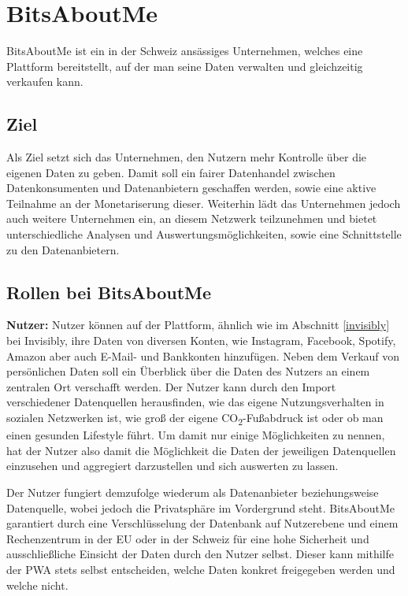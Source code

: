 \section{BitsAboutMe}
BitsAboutMe ist ein in der Schweiz ansässiges Unternehmen, welches eine Plattform bereitstellt, auf der man seine Daten verwalten und gleichzeitig verkaufen kann.

\subsection{Ziel}
Als Ziel setzt sich das Unternehmen, den Nutzern mehr Kontrolle über die eigenen Daten zu geben. Damit soll ein fairer Datenhandel zwischen Datenkonsumenten und Datenanbietern geschaffen werden, sowie eine aktive Teilnahme an der Monetariserung dieser. Weiterhin lädt das Unternehmen jedoch auch weitere Unternehmen ein, an diesem Netzwerk teilzunehmen und bietet unterschiedliche Analysen und Auswertungsmöglichkeiten, sowie eine Schnittstelle zu den Datenanbietern.

\subsection{Rollen bei BitsAboutMe}
\textbf{Nutzer:} Nutzer können auf der Plattform, ähnlich wie im Abschnitt \ref{invisibly} bei Invisibly, ihre Daten von diversen Konten, wie Instagram, Facebook, Spotify, Amazon aber auch E-Mail- und Bankkonten hinzufügen. Neben dem Verkauf von persönlichen Daten soll ein Überblick über die Daten des Nutzers an einem zentralen Ort verschafft werden. Der Nutzer kann durch den Import verschiedener Datenquellen herausfinden, wie das eigene Nutzungsverhalten in sozialen Netzwerken ist, wie groß der eigene CO\textsubscript{2}-Fußabdruck ist oder ob man einen gesunden Lifestyle führt. Um damit nur einige Möglichkeiten zu nennen, hat der Nutzer also damit die Möglichkeit die Daten der jeweiligen Datenquellen einzusehen und aggregiert darzustellen und sich auswerten zu lassen. \newline

\noindent Der Nutzer fungiert demzufolge wiederum als Datenanbieter beziehungsweise Datenquelle, wobei jedoch die Privatsphäre im Vordergrund steht. BitsAboutMe garantiert durch eine Verschlüsselung der Datenbank auf Nutzerebene und einem Rechenzentrum in der EU oder in der Schweiz für eine hohe Sicherheit und ausschließliche Einsicht der Daten durch den Nutzer selbst. Dieser kann mithilfe der \gls{PWA} stets selbst entscheiden, welche Daten konkret freigegeben werden und welche nicht.\newline

